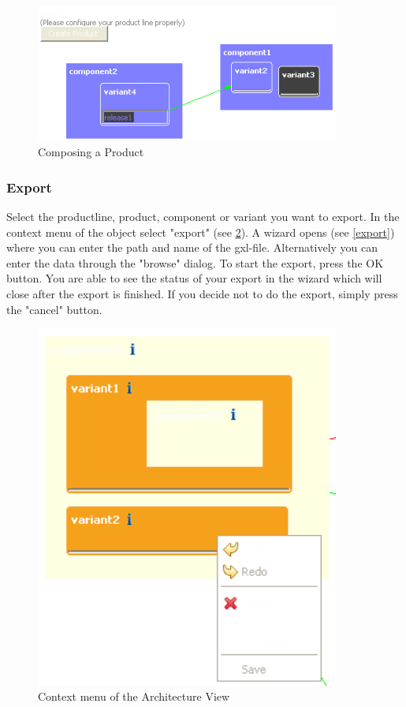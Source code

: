 \begin{figure}[h!]
\begin{center}
\includegraphics[width=10cm]{composeproduct.png}
   \caption{Composing a Product}
\label{compose}
\end{center}
\end{figure}\par


\subsubsection{Export}

Select the productline, product, component or variant you want to export. In the
context menu of the object select "export" (see \ref{archcontext}). A wizard opens (see \ref{export}) where you can enter
the path and name of the gxl-file. Alternatively you can enter 
the data through the "browse" dialog. To start the export, press the OK button.
You are able to see the status of your export in the wizard which will close after
the export is finished. If you decide not to do the export, simply press the 
"cancel" button.

\begin{figure}[h!]
\begin{center}
\includegraphics[width=10cm]{architecturekontext.png}
   \caption{Context menu of the Architecture View}
\label{archcontext}
\end{center}
\end{figure}\par

